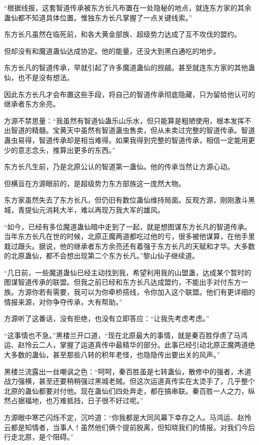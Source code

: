 \begin{this_body}
“根据线报，这套智道传承被东方长凡布置在一处隐秘的地点，就连东方家的其余蛊仙都不知道具体位置。惟独东方长凡掌握了一点关键线索。”

东方长凡虽然在临死前，和各大黄金部族、超级势力达成了互不攻伐的盟约。

但却没有和魔道蛊仙达成协定。他的能量，还没大到黑白通吃的地步。

东方长凡的智道传承，早就引起了许多魔道蛊仙的觊觎。甚至就连东方家的其他蛊仙，也不是没有想法。

因此东方长凡才会布置这些手段，将自己的智道传承彻底隐藏，只为留给他认可的继承者东方余亮。

方源不禁思量：“我虽然有智道仙蛊乐山乐水，但只能算是粗陋使用，根本发挥不出智道的精髓。宝黄天中虽然有智道蛊虫售卖，但从未卖过完整的智道传承。智道蛊虫易得，智道传承却是相当难得。如果我得到完整的智道传承，相信一定能用更少的意志念头，推算出更多的东西。”

东方长凡生前，乃是北原公认的智道第一蛊仙。他的传承当然让方源心动。

但横亘在方源眼前的，是超级势力东方部族这一庞然大物。

东方家虽然失去了东方长凡，但仍旧有数位蛊仙维持局面。反观方源，刚刚激斗黑城，青提仙元消耗大半，难以再现万我大军的雄风。

“如今，已经有多位魔道蛊仙暗中走到了一起，就是想图谋东方长凡的智道传承。当年东方长凡在世的时候，北原正魔两道都吃过他的亏，很多被他谋算，在他手里栽过跟头。据说，他的继承者东方余亮还有着强于东方长凡的天赋和才华。大多数的北原蛊仙，都不会想出现第二个东方长凡。”黎山仙子继续道。

“几日前，一些魔道蛊仙已经主动找到我，希望利用我的山盟蛊，达成某个暂时的图谋智道传承的联盟。但我之前已经和东方长凡达成盟约，不能出手对付东方一族。方源你若有需要，我可以为你牵桥搭线，令你加入这个联盟。他们有更详细的情报来源，对你争夺传承，大有帮助。”

方源听了这番话，没有拒绝，也没有立即答应：“让我先考虑考虑。”

“这事情也不急。”黑楼兰开口道，“现在北原最大的事情，就是秦百胜俘虏了马鸿运、赵怜云二人，掌握了运道真传中最精华的部分。此事已经引动北原正魔两道绝大多数的蛊仙，甚至那些八转的积年老怪，也隐隐传出要出关的风声。”

黑楼兰流露出一丝嘲讽之色：“呵呵，秦百胜虽是七转蛊仙，散修中的强者，木道战力强横，甚至还要稍稍强过黑城老贼。但这次运道真传实在太烫手了，几乎整个北原的蛊仙都要对付他。现在蛊仙们四处奔走，都在搞串联。秦百胜一人之力，纵然占据福地，也万难抵挡，日子很不好过呢。”

方源眼中寒芒闪烁不定，沉吟道：“你我都是大同风幕下幸存之人。马鸿运、赵怜云都是知情者，当事人！虽然他们俩个提前脱离，但知晓我们的情报。对我们今后行走北原，是个阻碍。”


\end{this_body}
